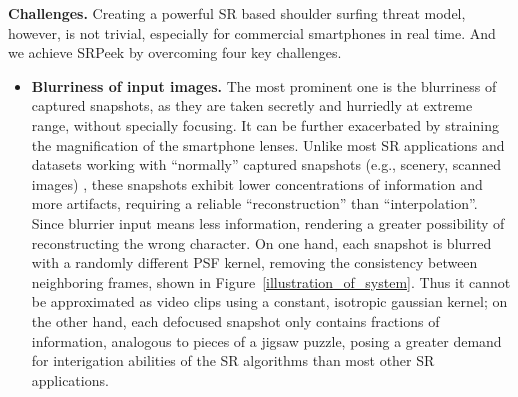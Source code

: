 \vspace{1mm}
\noindent
\textbf{Challenges.} Creating a powerful SR based shoulder surfing threat model, however, is not trivial, especially for commercial smartphones in real time. And we achieve \textsf{SRPeek} by overcoming four key challenges.


\begin{itemize}[leftmargin=*]
  \item \textbf{Blurriness of input images.} The most prominent one is the blurriness of captured snapshots, as they are taken secretly and hurriedly at extreme range, without specially focusing. It can be further exacerbated by straining the magnification of the smartphone lenses. Unlike most SR applications and datasets working with ``normally'' captured snapshots (e.g., scenery, scanned images) \cite{nasrollahi2020deep,lyn2020image}, these snapshots exhibit lower concentrations of information and more artifacts, requiring a reliable ``reconstruction'' than ``interpolation''. Since blurrier input means less information, rendering a greater possibility of reconstructing the wrong character. 
  On one hand, each snapshot is blurred with a randomly different PSF kernel, removing the consistency between neighboring frames, shown in Figure~\ref{illustration_of_system}. Thus it cannot be approximated as video clips using a constant, isotropic gaussian kernel; on the other hand, each defocused snapshot only contains fractions of information, analogous to pieces of a jigsaw puzzle, posing a greater demand for interigation abilities of the SR algorithms than most other SR applications.

\end{itemize}
